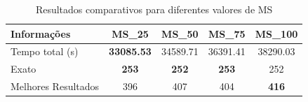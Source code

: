 \begin{table}[H]
\centering
\begin{tabular}{|l|c|c|c|c|}
\hline
\rowcolor{gray!30} \textbf{Informações} & \textbf{MS\_25} & \textbf{MS\_50} & \textbf{MS\_75} & \textbf{MS\_100} \\
\hline
Tempo total (s)             & \cellcolor{blue!20} \textbf{33085.53} & 34589.71 & 36391.41 & 38290.03 \\
Exato       & \cellcolor{blue!20} \textbf{253}      & \textbf{252}      & \cellcolor{blue!20} \textbf{253}      & 252      \\
Melhores Resultados         & 396      & 407      & 404      & \cellcolor{blue!20} \textbf{416}      \\
\hline
\end{tabular}
\caption{Resultados comparativos para diferentes valores de MS}
\label{tab:resultados_ms}
\end{table}


